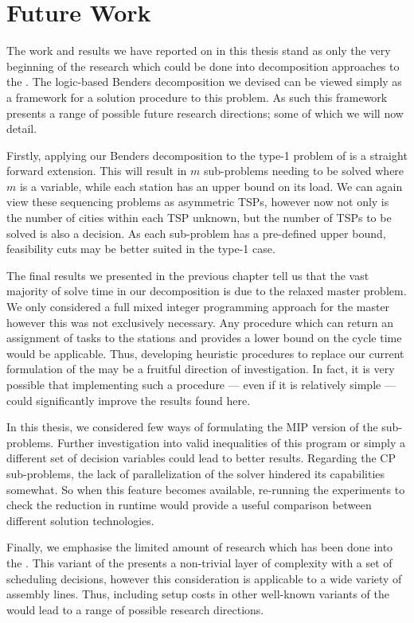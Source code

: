 \section{Future Work}
\label{sec:conc:future}
The work and results we have reported on in this thesis
stand as only the very beginning of the research which
could be done into decomposition approaches to the \sua{}.
The logic-based Benders decomposition we devised can be viewed
simply as a framework for a solution procedure to this problem.
As such this framework presents a range of possible future research directions;
some of which we will now detail.

Firstly, applying our Benders decomposition to the type-1 problem
of \sua{} is a straight forward extension.
This will result in $m$ sub-problems needing to be solved
where $m$ is a variable, while each station has an upper bound
on its load.
We can again view these sequencing problems as asymmetric TSPs, however
now not only is the number of cities within each TSP unknown,
but the number of TSPs to be solved is also a decision.
As each sub-problem has a pre-defined upper bound, feasibility
cuts may be better suited in the type-1 case.

The final results we presented in the previous chapter tell us that
the vast majority of solve time in our decomposition is due to
the relaxed master problem.
We only considered a full mixed integer programming approach for the 
master however this was not exclusively necessary. 
Any procedure which can return an assignment of tasks to the stations and provides 
a lower bound on the cycle time would be applicable.
Thus, developing heuristic procedures to replace our current formulation of
the \rmp{} may be a fruitful direction of investigation.
In fact, it is very possible that implementing such a procedure --- even if it is 
relatively simple --- could significantly improve the results 
found here.

In this thesis, we considered few ways of formulating the MIP
version of the sub-problems.
Further investigation into valid inequalities of this program
or simply a different set of decision variables could lead
to better results.
Regarding the CP sub-problems, the lack of parallelization
of the \chuffed solver hindered its capabilities somewhat.
So when this feature becomes available, re-running the
experiments to check the reduction in runtime 
would provide a useful comparison between different
solution technologies.

Finally, we emphasise the limited amount of research which
has been done into the \sua{}.
This variant of the \albp{} presents a non-trivial layer of complexity
with a set of scheduling decisions,
however this consideration is applicable to a wide variety of assembly lines.
Thus, including setup costs in other well-known variants of the 
\albp{} would lead to a range of possible research directions.
